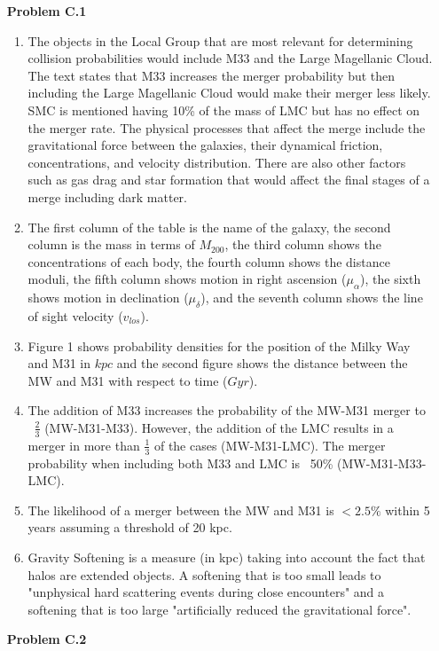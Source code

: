 \documentclass{article}
\theoremstyle{plain}
\begin{document}
\begin{enumerate}
\begin{enumerate}[label=(\alph*)]
          \end{enumerate}
    \item[\textbf{Problem C.1}]
          \begin{enumerate}[label=(\alph*)]
              \item The objects in the Local Group that are most relevant for determining collision probabilities would include M33 and the Large Magellanic Cloud. The text states that M33 increases the merger probability but then including the Large Magellanic Cloud would make their merger less likely. SMC is mentioned having 10\% of the mass of LMC but has no effect on the merger rate. The physical processes that affect the merge include the gravitational force between the galaxies, their dynamical friction, concentrations, and velocity distribution. There are also other factors such as gas drag and star formation that would affect the final stages of a merge including dark matter.
              \item The first column of the table is the name of the galaxy, the second column is the mass in terms of $M_{200}$, the third column shows the concentrations of each body, the fourth column shows the distance moduli, the fifth column shows motion in right ascension ($\mu_{\alpha}$), the sixth shows motion in declination ($\mu_{\delta}$), and the seventh column shows the line of sight velocity ($v_{los}$).
              \item Figure 1 shows probability densities for the position of the Milky Way and M31 in $kpc$ and the second figure shows the distance between the MW and M31 with respect to time ($Gyr$).
              \item The addition of M33 increases the probability of the MW-M31 merger to ~$\frac{2}{3}$ (MW-M31-M33). However, the addition of the LMC results in a merger in more than $\frac{1}{3}$ of the cases (MW-M31-LMC). The merger probability when including both M33 and LMC is ~50\% (MW-M31-M33-LMC).
              \item The likelihood of a merger between the MW and M31 is  $<2.5\%$ within 5 years assuming a threshold of 20 kpc.
              \item Gravity Softening is a measure (in kpc) taking into account the fact that halos are extended objects. A softening that is too small leads to "unphysical hard scattering events during close encounters" and a softening that is too large "artificially reduced the gravitational force".
          \end{enumerate}
    \item[\textbf{Problem C.2}]

\end{enumerate}
\end{document}
